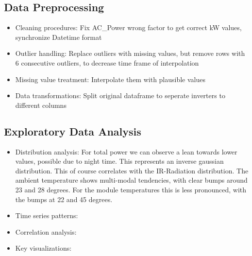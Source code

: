 \documentclass[10pt]{article}
\begin{document}
\subsection{Data Preprocessing}
\begin{itemize}
    \item Cleaning procedures: Fix AC\_Power wrong factor to get correct kW values, synchronize Datetime format 
    \item Outlier handling: Replace outliers with missing values, but remove rows with 6 consecutive outliers, to decrease time frame of interpolation
    \item Missing value treatment: Interpolate them with plausible values
    \item Data transformations: Split original dataframe to seperate inverters to different columns
\end{itemize}

\subsection{Exploratory Data Analysis}
\begin{itemize}
    \item Distribution analysis: For total power we can observe a lean towards lower values, possible due to night time. This represents an inverse gaussian distribution. This of course correlates with the IR-Radiation distribution. The ambient temperature shows multi-modal tendencies, with clear bumps around 23 and 28 degrees. For the module temperatures this is less pronounced, with the bumps at 22 and 45 degrees.
    \item Time series patterns:
    \item Correlation analysis:
    \item Key visualizations:
\end{itemize}
\end{document}
